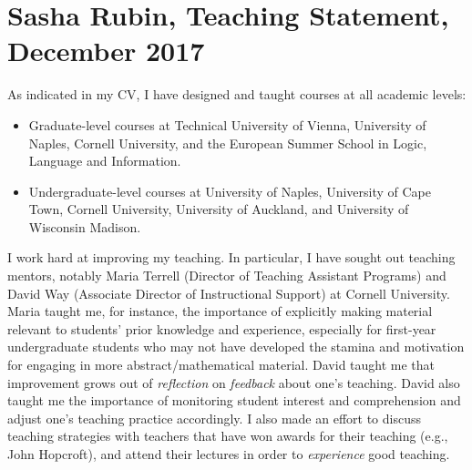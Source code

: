\documentclass[a4paper,10pt]{scrartcl}
\begin{document}

\section*{Sasha Rubin, Teaching Statement, December 2017}


As indicated in my CV, I have designed and taught courses at all academic levels:
\begin{itemize}
 \item Graduate-level courses at Technical University of Vienna, University of Naples, Cornell University, and the European Summer School in Logic, Language and Information. 
 \item Undergraduate-level courses at University of Naples, University of Cape Town, Cornell University, University of Auckland, and University of Wisconsin Madison.
\end{itemize}

I work hard at improving my teaching. In particular, I have sought out teaching mentors, notably Maria Terrell (Director of Teaching Assistant Programs) and David Way (Associate Director of Instructional Support) at Cornell University. Maria taught me, for instance, the importance of explicitly making material relevant to students' prior knowledge and experience, especially for first-year undergraduate students who may not have developed the stamina and motivation for engaging in more abstract/mathematical material. David taught me that improvement grows out of \textit{reflection} on \textit{feedback} about one's teaching. David also taught me the importance of monitoring student interest and comprehension and adjust one's teaching practice accordingly. I also made an effort to discuss teaching strategies with teachers that have won awards for their teaching (e.g., John Hopcroft), and attend their lectures in order 
to \textit{experience} good teaching.
\end{document}
